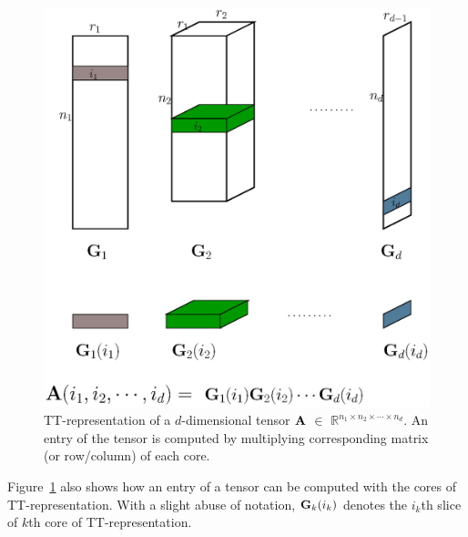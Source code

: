 \documentclass[runningheads]{llncs}
\newcommand{\tensor}[1]{{\cal\textbf{#1}\xspace}}
\begin{document}
\begin{figure}[!b]
	\begin{center}	
		\includegraphics[scale=0.5]{./ttentry.eps}
		\caption{TT-representation of a $d$-dimensional tensor $\tensor{A}$ $\in$ $\mathbb{R}^{n_1 \times n_2 \times \cdots \times n_d}$. An entry of the tensor is computed by multiplying corresponding matrix (or row/column) of each core.\label{fig:ttdiagram}}
	\end{center}
\end{figure}

Figure~\ref{fig:ttdiagram} also shows how an entry of a tensor can be computed with the cores of TT-representation. With a slight abuse of notation, $\tensor{G}_k(i_k)$ denotes the $i_k$th slice of $k$th core of TT-representation.
\end{document}
